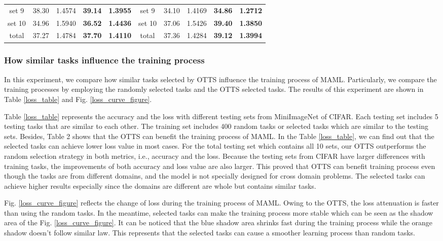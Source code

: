 \documentclass[10pt,journal,compsoc]{IEEEtran}
\begin{document}
\begin{table*}[!t]
\begin{tabular}{cccccccccc}
set 9              &38.30          &1.4574         &\textbf{39.14}          &\textbf{1.3955}    &set 9       &34.10      &1.4169         &\textbf{34.86}      &\textbf{1.2712}\\
set 10             &34.96          &1.5940         &\textbf{36.52}          &\textbf{1.4436}    &set 10      &37.06      &1.5426         &\textbf{39.40}      &\textbf{1.3850}\\
\midrule
total               &37.27          &1.4784         &\textbf{37.70}         &\textbf{1.4110}    &total       &37.36      &1.4284         &\textbf{39.12}      &\textbf{1.3994}\\
\bottomrule
\end{tabular}
\end{table*}

\subsubsection{How similar tasks influence the training process}

In this experiment, we compare how similar tasks selected by OTTS influence the training process of MAML. Particularly, we compare the training processes by employing the randomly selected tasks and the OTTS selected tasks. The results of this experiment are shown in Table \ref{loss_table} and Fig. \ref{loss_curve_figure}.

Table \ref{loss_table} represents the accuracy and the loss with different testing sets from MiniImageNet of CIFAR. Each testing set includes 5 testing tasks that are similar to each other. The training set includes 400 random tasks or selected tasks which are similar to the testing sets. Besides, Table 2 shows that the OTTS can benefit the training process of MAML. In the Table \ref{loss_table}, we can find out that the selected tasks can achieve lower loss value in most cases. For the total testing set which contains all 10 sets, our OTTS outperforms the random selection strategy in both metrics, i.e., accuracy and the loss. Because the testing sets from CIFAR have larger differences with training tasks, the improvements of both accuracy and loss value are also larger. This proved that OTTS can benefit training process even though the tasks are from different domains, and the model is not specially designed for cross domain problems. The selected tasks can achieve higher results especially since the domains are different are whole but contains similar tasks.

Fig. \ref{loss_curve_figure} reflects the change of loss during the training process of MAML. Owing to the OTTS, the loss attenuation is faster than using the random tasks. In the meantime, selected tasks can make the training process more stable which can be seen as the shadow area of the Fig. \ref{loss_curve_figure}. It can be noticed that the blue shadow area shrinks fast during the training process while the orange shadow doesn't follow similar law. This represents that the selected tasks can cause a smoother learning process than random tasks.
\end{document}
